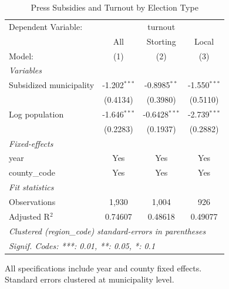 
\begin{table}[htbp]
   \caption{\label{tab:election_type} Press Subsidies and Turnout by Election Type}
   \centering
   \begin{tabular}{lccc}
      \tabularnewline \midrule \midrule
      Dependent Variable: & \multicolumn{3}{c}{turnout}\\
                              & All            & Storting        & Local \\   
      Model:                  & (1)            & (2)             & (3)\\  
      \midrule
      \emph{Variables}\\
      Subsidized municipality & -1.202$^{***}$ & -0.8985$^{**}$  & -1.550$^{***}$\\   
                              & (0.4134)       & (0.3980)        & (0.5110)\\   
      Log population          & -1.646$^{***}$ & -0.6428$^{***}$ & -2.739$^{***}$\\   
                              & (0.2283)       & (0.1937)        & (0.2882)\\   
      \midrule
      \emph{Fixed-effects}\\
      year                    & Yes            & Yes             & Yes\\  
      county\_code            & Yes            & Yes             & Yes\\  
      \midrule
      \emph{Fit statistics}\\
      Observations            & 1,930          & 1,004           & 926\\  
      Adjusted R$^2$          & 0.74607        & 0.48618         & 0.49077\\  
      \midrule \midrule
      \multicolumn{4}{l}{\emph{Clustered (region\_code) standard-errors in parentheses}}\\
      \multicolumn{4}{l}{\emph{Signif. Codes: ***: 0.01, **: 0.05, *: 0.1}}\\
   \end{tabular}
   
   \par \raggedright 
   All specifications include year and county fixed effects.\\
   Standard errors clustered at municipality level.
\end{table}


